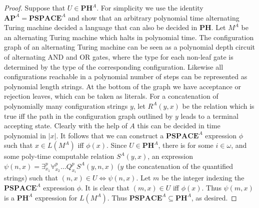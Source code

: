 \documentclass{article}
\theoremstyle{definition}
\theoremstyle{plain}
\theoremstyle{theorem}
\begin{document}
\begin{proof}
	Suppose that $U \in \bm{PH}^A$. For simplicity we use the identity $\bm{AP}^A = \bm{PSPACE}^A$ and show that an arbitrary polynomial time alternating Turing machine decided a language that can also be decided in $\bm{PH}$. Let $M^A$ be an alternating Turing machine which halts in polynomial time. The configuration graph of an alternating Turing machine can be seen as a polynomial depth circuit of alternating AND and OR gates, where the type for each non-leaf gate is determined by the type of the corresponding configuration. Likewise all configurations reachable in a polynomial number of steps can be represented as polynomial length strings. At the bottom of the graph we have acceptance or rejection leaves, which can be taken as literals. For a concatenation of polynomially many configuration strings $y$, let $R^A(y,x)$ be the relation which is true iff the path in the configuration graph outlined by $y$ leads to a terminal accepting state. Clearly with the help of $A$ this can be decided in time polynomial in $|x|$. It follows that we can construct a $\bm{PSPACE}^A$ expression $\phi$ such that $x \in L(M^A)$ iff $\phi(x)$. Since $U \in \bm{PH}^A$, there is for some $i \in \omega$, and some poly-time computable relation $S^A(y,x)$, an expression $\psi(n,x) = \exists^p_{x_1} \forall^p_{x_2} \ldots Q^p_{x_i} S^A(y,n,x)$ ($y$ the concatenation of the quantified strings) such that $(n,x) \in U \iff \psi(n,x)$. Let $m$ be the integer indexing the $\bm{PSPACE}^A$ expression $\phi$. It is clear that $(m,x) \in U$ iff $\phi(x)$. Thus $\psi(m,x)$ is a $\bm{PH}^A$ expression for $L(M^A)$. Thus $\bm{PSPACE}^A \subseteq \bm{PH}^A$, as desired. \par 
	
\end{proof}
 
\end{document}
